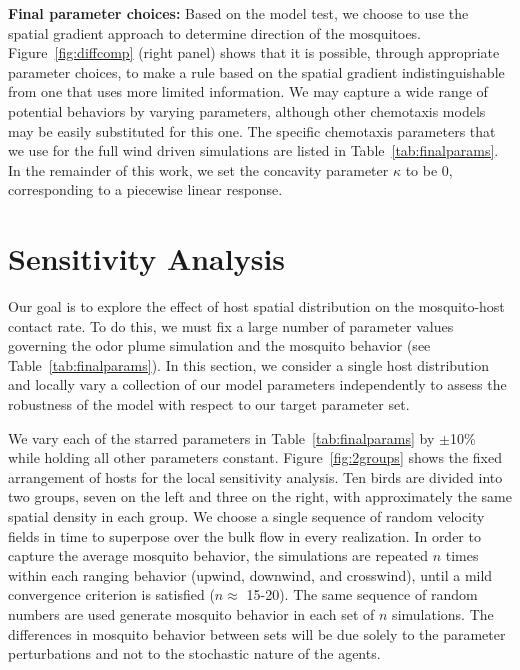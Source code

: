 \documentclass[12pt]{article}
\begin{document}
\textbf{Final parameter choices:} Based on the model test, we choose to use the spatial gradient approach to determine direction of the mosquitoes.
Figure~\ref{fig:diffcomp} (right panel) shows that it is possible, through appropriate parameter choices, to make a rule based on the spatial gradient indistinguishable from one that uses more limited information. We may capture a wide range of potential behaviors by varying parameters, although other chemotaxis models may be easily substituted for this one. The specific chemotaxis parameters that we use for the full wind driven simulations are listed in Table~\ref{tab:finalparams}. In the remainder of this work, we set the concavity parameter $\kappa$ to be 0, corresponding to a piecewise linear response.


\section{Sensitivity Analysis}\label{sec:SA}
Our goal is to explore the effect of host spatial distribution on the mosquito-host contact rate. To do this, we must fix a large number of parameter values governing the odor plume simulation and the mosquito behavior (see Table~\ref{tab:finalparams}). In this section, we consider a single host distribution and locally vary a collection of our model parameters independently to assess the robustness of the model with respect to our target parameter set.

We vary each of the starred parameters in Table~\ref{tab:finalparams} by $\pm$10\% while holding all other parameters constant. Figure~\ref{fig:2groups} shows the fixed arrangement of hosts for the local sensitivity analysis. Ten birds are divided into two groups, seven on the left and three on the right, with approximately the same spatial density in each group. We choose a single sequence of random velocity fields in time to superpose over the bulk flow in every realization. In order to capture the average mosquito behavior, the simulations are repeated $n$ times within each ranging behavior (upwind, downwind, and crosswind), until a mild convergence criterion is satisfied ($n \approx$ 15-20). The same sequence of random numbers are used generate mosquito behavior in each set of $n$ simulations. The differences in mosquito behavior between sets will be due solely to the parameter perturbations and not to the stochastic nature of the agents.
\end{document}
